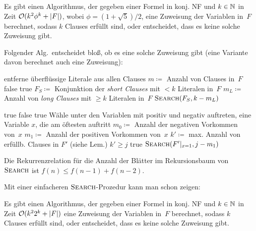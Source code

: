 \documentclass{cheat-sheet}
\newcommand{\size}[1]{\abs{#1}} %
\renewcommand{\O}{\mathcal{O}} %
\newcommand{\ceil}[1]{\lceil #1 \rceil} %
\begin{document}
\begin{satz}
  Es gibt einen Algorithmus, der gegeben einer Formel in konj. NF und $k \in \mathbb{N}$ in Zeit $\O(k^2 \phi^k + \size{F})$, wobei $\phi = (1 + \sqrt{5}) / 2$, eine Zuweisung der Variablen in~$F$ berechnet, sodass $k$ Clauses erfüllt sind, oder entscheidet, dass es keine solche Zuweisung gibt.
\end{satz}

Folgender Alg.\ entscheidet bloß, ob es eine solche Zuweisung gibt (eine Variante davon berechnet auch eine Zuweisung):

\begin{algorithmic}
    \State entferne überflüssige Literale aus allen Clauses
    \State $m \coloneqq $ Anzahl von Clauses in~$F$
     \Return false \EndIf
    \If{$k \leq \ceil{m/2}$} \Return true \EndIf
    \State $F_S \coloneqq $ Konjunktion der \textit{short Clauses} mit $< k$ Literalen in~$F$
    \State $m_L \coloneqq $ Anzahl von \textit{long Clauses} mit $\geq k$ Literalen in~$F$
    \State \Return $\Call{Search}{F_S, k - m_L}$
  \EndFunction

     \Return true \EndIf
     \Return false \EndIf
      \State \Return true
    \EndIf
    \State Wähle unter den Variablen mit positiv und negativ auftreten,
    \State \quad eine Variable $x$, die am öftesten auftritt
    \State $m_0 \coloneqq $ Anzahl der negativen Vorkommen von~$x$
    \State $m_1 \coloneqq $ Anzahl der positiven Vorkommen von~$x$
      \State $k' \coloneqq $ max. Anzahl von erfüllb. Clauses in $F'$ (siehe Lem.)
      \State \Return $k' \geq j$
    \EndIf
      \Return true
    \EndIf
    \Return $\Call{Search}{F'|_{x=1}, j - m_1}$
  \EndFunction
\end{algorithmic}

\begin{beweisidee}
  Die Rekurrenzrelation für die Anzahl der Blätter im Rekursionsbaum von~$\Call{Search}{}$ ist $f(n) \leq f(n-1) + f(n-2)$.
\end{beweisidee}

Mit einer einfacheren $\Call{Search}{}$-Prozedur kann man schon zeigen:

\begin{satz}
  Es gibt einen Algorithmus, der gegeben einer Formel in konj. NF und $k \in \mathbb{N}$ in Zeit $\O(k^2 2^k + \size{F})$ eine Zuweisung der Variablen in~$F$ berechnet, sodass $k$ Clauses erfüllt sind, oder entscheidet, dass es keine solche Zuweisung gibt.
\end{satz}
\end{document}
